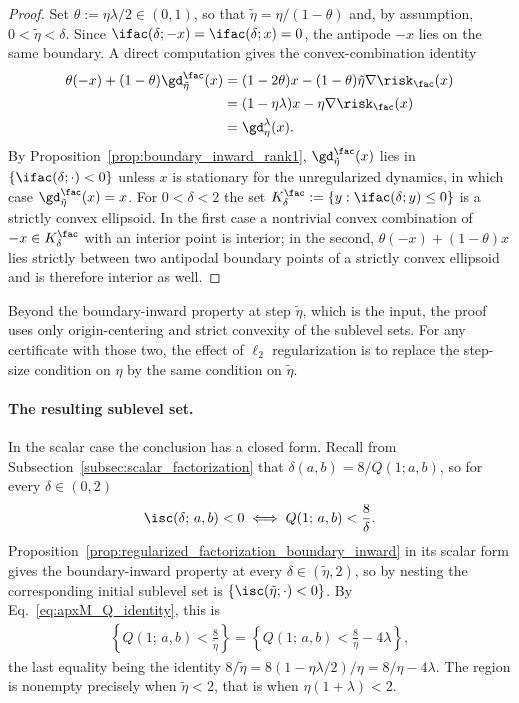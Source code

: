\documentclass{article}
\begin{document}
\begin{proof}
Set $\theta:=\eta\lambda/2\in(0,1)$, so that $\tilde\eta=\eta/(1-\theta)$ and,
by assumption, $0<\tilde\eta<\delta$. Since $\ifac(\delta;-x)=\ifac(\delta;x)=0$,
the antipode $-x$ lies on the same boundary. A direct computation gives the
convex-combination identity
\begin{align}
\theta(-x)+(1-\theta)\gd_{\tilde\eta}^\fac(x)
&=(1-2\theta)x-(1-\theta)\tilde\eta\nabla\risk_\fac(x) \\
&=(1-\eta\lambda)x-\eta\nabla\risk_\fac(x) \\
&=\gd_\eta^\lambda(x).
\label{eq:apxM_effective_step_identity}
\end{align}
By Proposition~\ref{prop:boundary_inward_rank1}, $\gd_{\tilde\eta}^\fac(x)$
lies in $\{\ifac(\delta;\cdot)<0\}$ unless $x$ is stationary for the
unregularized dynamics, in which case $\gd_{\tilde\eta}^\fac(x)=x$. For
$0<\delta<2$ the set $K_\delta^\fac:=\{y:\ifac(\delta;y)\le0\}$ is a strictly
convex ellipsoid. In the first case a nontrivial convex combination of
$-x\in K_\delta^\fac$ with an interior point is interior; in the second,
$\theta(-x)+(1-\theta)x$ lies strictly between two antipodal boundary points
of a strictly convex ellipsoid and is therefore interior as well.
\end{proof}

Beyond the boundary-inward property at step $\tilde\eta$, which is the input,
the proof uses only origin-centering and strict convexity of the sublevel
sets. For any certificate with those two, the effect of $\ell_2$
regularization is to replace the step-size condition on $\eta$ by the same
condition on $\tilde\eta$.

\paragraph{The resulting sublevel set.}
In the scalar case the conclusion has a closed form. Recall from
Subsection~\ref{subsec:scalar_factorization} that
$\delta(a,b)=8/Q(1;a,b)$, so for every $\delta\in(0,2)$
\begin{align}
    \isc(\delta;\,a,b)<0
    \iff
    Q(1;\,a,b)<\frac{8}{\delta}.
    \label{eq:apxM_Q_identity}
\end{align}
Proposition~\ref{prop:regularized_factorization_boundary_inward} in its scalar
form gives the boundary-inward property at every $\delta\in(\tilde\eta,2)$, so
by nesting the corresponding initial sublevel set is
$\{\isc(\tilde\eta;\cdot)<0\}$. By Eq.~\eqref{eq:apxM_Q_identity}, this is
\begin{align}
    \left\{
        Q(1;\,a,b)<\frac{8}{\tilde\eta}
    \right\}
    =
    \left\{
        Q(1;\,a,b)<\frac{8}{\eta}-4\lambda
    \right\},
    \label{eq:apxM_recovered_region}
\end{align}
the last equality being the identity
$8/\tilde\eta=8(1-\eta\lambda/2)/\eta=8/\eta-4\lambda$. The region is nonempty
precisely when $\tilde\eta<2$, that is when $\eta(1+\lambda)<2$.
\end{document}
